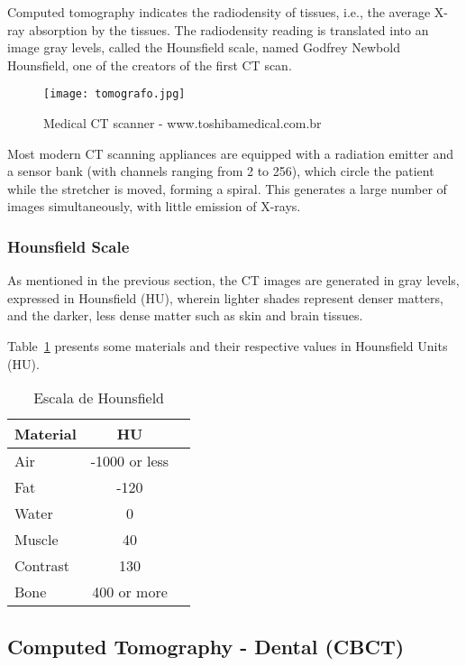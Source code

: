 Computed tomography indicates the radiodensity of tissues, i.e., the average X-ray absorption by the tissues. The radiodensity reading is translated into an image gray levels, called the Hounsfield scale, named Godfrey Newbold Hounsfield, one of the creators of the first CT scan.

\begin{figure}[!htb]
\centering
\texttt{[image: tomografo.jpg]}
\caption{Medical CT scanner - www.toshibamedical.com.br}
\end{figure}

Most modern CT scanning appliances are equipped with a radiation emitter and a sensor bank (with channels ranging from 2 to 256), which circle the patient while the stretcher is moved, forming a spiral. This generates a large number of images simultaneously, with little emission of X-rays.

\subsubsection{Hounsfield Scale}

As mentioned in the previous section, the CT images are generated in gray levels, expressed in Hounsfield (HU), wherein lighter shades represent denser matters, and the darker, less dense matter such as skin and brain tissues. 

Table~\ref{tab:escala_hounsfield} presents some materials and their respective values in Hounsfield Units (HU).

\begin{table}[h]
\centering
\caption{Escala de Hounsfield}
\begin{tabular}{lcc}\\
\hline %
Material & HU\\
\hline
\hline
Air & -1000 or less\\
Fat & -120\\
Water & 0\\
Muscle & 40\\
Contrast & 130\\
Bone & 400 or more\\
\hline
\end{tabular}
\label{tab:escala_hounsfield}
\end{table}


\subsection{Computed Tomography - Dental (CBCT)}

